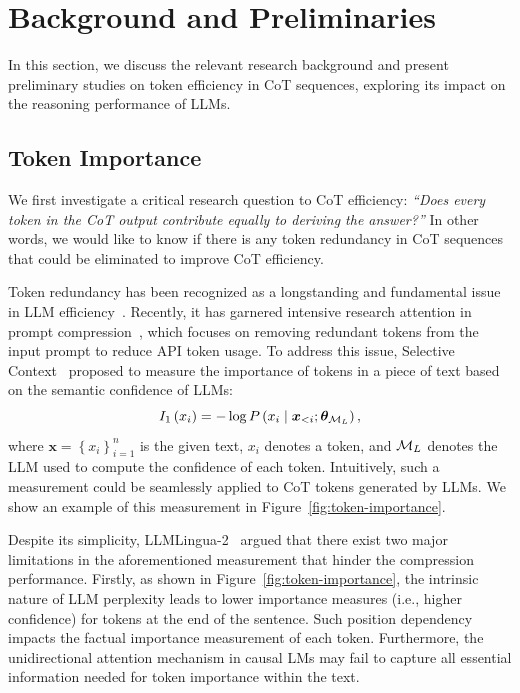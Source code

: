 \section{Background and Preliminaries}
\label{sec:preliminaries}

In this section, we discuss the relevant research background and present preliminary studies on token efficiency in CoT sequences, exploring its impact on the reasoning performance of LLMs.

\subsection{Token Importance}
\label{sec:token-importance}

We first investigate a critical research question to CoT efficiency: \textit{``Does every token in the CoT output contribute equally to deriving the answer?''} In other words, we would like to know if there is any token redundancy in CoT sequences that could be eliminated to improve CoT efficiency.

Token redundancy has been recognized as a longstanding and fundamental issue in LLM efficiency~\cite{hou:2022tokendropbert, zhang2023h2o, lin2024criticaltokenpretrain, Chen:2024FastV}. Recently, it has garnered intensive research attention in prompt compression~\cite{li:2023selective, jiang2023:llmlingua, pan:2024llmlingua2}, which focuses on removing redundant tokens from the input prompt to reduce API token usage. To address this issue, Selective Context~\cite{li:2023selective} proposed to measure the importance of tokens in a piece of text based on the semantic confidence of LLMs:
\begin{equation}
I_1\left(x_i\right)=-\log P\left(x_i \mid \bm{x}_{<{i}}; \bm{\theta}_{\mathcal{M}_L}\right),
\label{eq:selectivecontext}
\end{equation}
where $\boldsymbol{x}=\left\{x_i\right\}_{i=1}^{n}$ is the given text, $x_i$ denotes a token, and $\mathcal{M}_L$ denotes the LLM used to compute the confidence of each token. Intuitively, such a measurement could be seamlessly applied to CoT tokens generated by LLMs. We show an example of this measurement in Figure~\ref{fig:token-importance}.



Despite its simplicity, LLMLingua-2~\cite{pan:2024llmlingua2} argued that there exist two major limitations in the aforementioned measurement that hinder the compression performance. Firstly, as shown in Figure~\ref{fig:token-importance}, the intrinsic nature of LLM perplexity leads to lower importance measures (i.e., higher confidence) for tokens at the end of the sentence. Such position dependency impacts the factual importance measurement of each token. Furthermore, the unidirectional attention mechanism in causal LMs may fail to capture all essential information needed for token importance within the text. 

